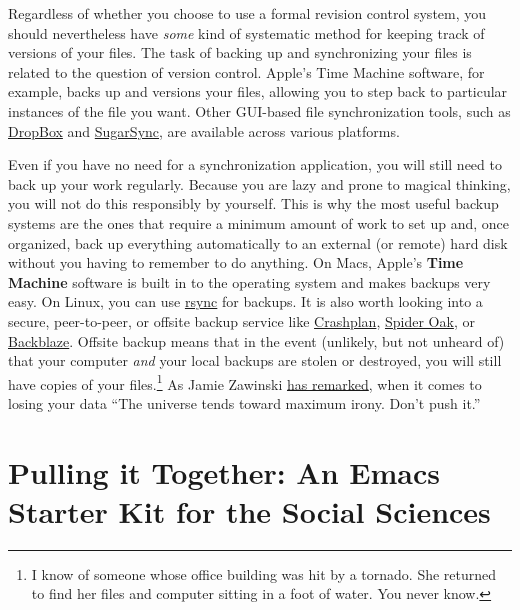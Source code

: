 \documentclass[11pt,article,oneside]{memoir}
\begin{document}
Regardless of whether you choose to use a formal revision control
system, you should nevertheless have \emph{some} kind of systematic
method for keeping track of versions of your files. The task of
backing up and synchronizing your files is related to the question of
version control. Apple's Time Machine software, for example, backs up
and versions your files, allowing you to step back to particular
instances of the file you want. Other GUI-based file synchronization
tools, such as \href{http://www.getdropbox.com}{DropBox} and
\href{http://www.sugarsync.com/}{SugarSync}, are available across
various platforms.

Even if you have no need for a synchronization application, you will
still need to back up your work regularly. Because you are lazy and
prone to magical thinking, you will not do this responsibly by
yourself. This is why the most useful backup systems are the ones that
require a minimum amount of work to set up and, once organized, back
up everything automatically to an external (or remote) hard disk
without you having to remember to do anything. On Macs, Apple's
\textbf{Time Machine} software is built in to the operating system and
makes backups very easy. On Linux, you can use
\href{http://www.psychocats.net/ubuntu/backup}{rsync} for backups. It
is also worth looking into a secure, peer-to-peer, or offsite backup
service like \href{http://www.crashplan.com/}{Crashplan},
\href{https://spideroak.com/}{Spider Oak}, or
\href{http://www.backblaze.com/}{Backblaze}. Offsite backup means that
in the event (unlikely, but not unheard of) that your computer
\emph{and} your local backups are stolen or destroyed, you will still
have copies of your files.\footnote{I know of someone whose office
  building was hit by a tornado. She returned to find her files and
  computer sitting in a foot of water. You never know. } As Jamie
Zawinski \href{http://jwz.livejournal.com/801607.html}{has remarked},
when it comes to losing your data ``The universe tends toward maximum
irony. Don't push it.''

\section*{Pulling it Together: An Emacs Starter Kit for the Social Sciences}
\label{sec-7}
\end{document}
